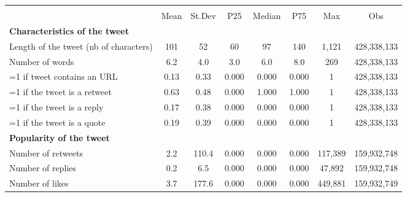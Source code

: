 {
\def\sym#1{\ifmmode^{#1}\else\(^{#1}\)\fi}
\begin{tabular}{l*{1}{ccccccc}}
\hline\hline
                    &\multicolumn{7}{c}{}                                                                      \\
                    &        Mean&      St.Dev&         P25&      Median&         P75&         Max&         Obs\\
\hline
\textbf{Characteristics of the tweet}&            &            &            &            &            &            &            \\
Length of the tweet (nb of characters)&         101&          52&          60&          97&         140&       1,121& 428,338,133\\
Number of words     &         6.2&         4.0&         3.0&         6.0&         8.0&         269& 428,338,133\\
=1 if tweet contains an URL&        0.13&        0.33&       0.000&       0.000&       0.000&           1& 428,338,133\\
=1 if the tweet is a retweet&        0.63&        0.48&       0.000&       1.000&       1.000&           1& 428,338,133\\
=1 if the tweet is a reply&        0.17&        0.38&       0.000&       0.000&       0.000&           1& 428,338,133\\
=1 if the tweet is a quote&        0.19&        0.39&       0.000&       0.000&       0.000&           1& 428,338,133\\
\textbf{Popularity of the tweet}&            &            &            &            &            &            &            \\
Number of retweets  &         2.2&       110.4&       0.000&       0.000&       0.000&     117,389& 159,932,748\\
Number of replies   &         0.2&         6.5&       0.000&       0.000&       0.000&      47,892& 159,932,748\\
Number of likes     &         3.7&       177.6&       0.000&       0.000&       0.000&     449,881& 159,932,749\\
\hline\hline
\end{tabular}
}
